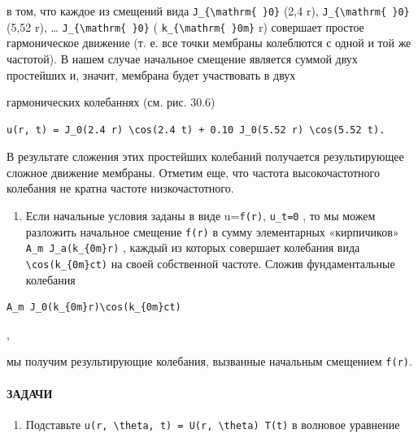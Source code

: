 \documentclass[
  ukrainian,
]{article}
\providecommand{\tightlist}{%
  \setlength{\itemsep}{0pt}\setlength{\parskip}{0pt}}
\begin{document}
в том, что каждое из смещений вида
\texttt{J\_\{\textbackslash{}mathrm\{\ \}0\}} (2,4 r),
\texttt{J\_\{\textbackslash{}mathrm\{\ \}0\}} (5,52 r), \ldots{}
\texttt{J\_\{\textbackslash{}mathrm\{\ \}0\}} (
\texttt{k\_\{\textbackslash{}mathrm\{\ \}0m\}} r) совершает простое
гармоническое движение (т. е. все точки мембраны колеблются с одной и
той же частотой). В нашем случае начальное смещение является суммой двух
простейших и, значит, мембрана будет участвовать в двух

гармонических колебаннях (см. рис. 30.6)

\begin{verbatim}
u(r, t) = J_0(2.4 r) \cos(2.4 t) + 0.10 J_0(5.52 r) \cos(5.52 t).
\end{verbatim}

В результате сложения этих простейших колебаний получается
результирующее сложное движение мембраны. Отметим еще, что частота
высокочастотного колебания не кратна частоте низкочастотного.

\begin{enumerate}
\def\labelenumi{\arabic{enumi}.}
\setcounter{enumi}{1}
\tightlist
\item
  Если начальные условия заданы в виде u=\texttt{f(r)}, \texttt{u\_t=0}
  , то мы можем разложить начальное смещение \texttt{f(r)} в сумму
  элементарных «кирпичиков» \texttt{A\_m\ J\_a(k\_\{0m\}r)} , каждый из
  которых совершает колебания вида
  \texttt{\textbackslash{}cos(k\_\{0m\}ct)} на своей собственной
  частоте. Сложив фундаментальные колебания
\end{enumerate}

\begin{verbatim}
A_m J_0(k_{0m}r)\cos(k_{0m}ct)
\end{verbatim}

,

мы получим результирующие колебания, вызванные начальным смещением
\texttt{f(r)}.

\paragraph{ЗАДАЧИ}\label{ux437ux430ux434ux430ux447ux438-6}

\begin{enumerate}
\def\labelenumi{\arabic{enumi}.}
\tightlist
\item
  Подставьте
  \texttt{u(r,\ \textbackslash{}theta,\ t)\ =\ U(r,\ \textbackslash{}theta)\ T(t)}
  в волновое уравнение
\end{enumerate}
\end{document}

